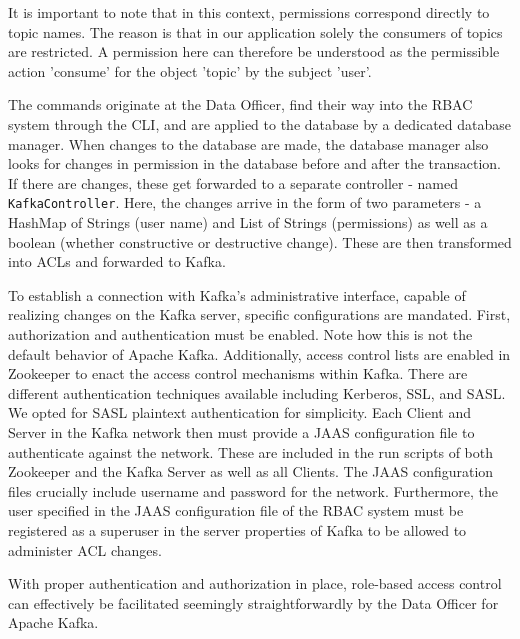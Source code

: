 It is important to note that in this context, permissions correspond directly to topic names. The reason is that in our application solely the consumers of topics are restricted. A permission here can therefore be understood as the permissible action 'consume' for the object 'topic' by the subject 'user'. \par
The commands originate at the Data Officer, find their way into the \ac{RBAC} system through the \ac{CLI}, and are applied to the database by a dedicated database manager. When changes to the database are made, the database manager also looks for changes in permission in the database before and after the transaction. If there are changes, these get forwarded to a separate controller - named \texttt{KafkaController}. Here, the changes arrive in the form of two parameters - a HashMap of Strings (user name) and List of Strings (permissions) as well as a boolean (whether constructive or destructive change). These are then transformed into \acp{ACL} and forwarded to Kafka. \par
To establish a connection with Kafka's administrative interface, capable of realizing changes on the Kafka server, specific configurations are mandated. First, authorization and authentication must be enabled. Note how this is not the default behavior of Apache Kafka. Additionally, access control lists are enabled in Zookeeper to enact the access control mechanisms within Kafka. There are different authentication techniques available including Kerberos, SSL, and \ac{SASL}. We opted for \ac{SASL} plaintext authentication for simplicity. Each Client and Server in the Kafka network then must provide a \ac{JAAS} configuration file to authenticate against the network. These are included in the run scripts of both Zookeeper and the Kafka Server as well as all Clients. The \ac{JAAS} configuration files crucially include username and password for the network. Furthermore, the user specified in the \ac{JAAS} configuration file of the \ac{RBAC} system must be registered as a superuser in the server properties of Kafka to be allowed to administer \ac{ACL} changes. \par
With proper authentication and authorization in place, role-based access control can effectively be facilitated seemingly straightforwardly by the Data Officer for Apache Kafka.




